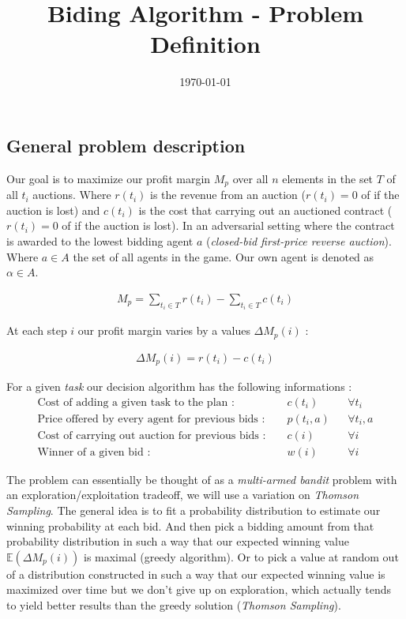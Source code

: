 \documentclass[11pt]{article}
\title{Biding Algorithm - Problem Definition}
\date{\today}
\begin{document}
\maketitle	

\subsection{General problem description}

Our goal is to maximize our profit margin $M_p$ over all $n$ elements in the set $T$ of all $t_i$ auctions. Where $r(t_i)$ is the revenue from an auction ($r(t_i)=0$ of if the auction is lost) and $c(t_i)$ is the cost that carrying out an auctioned contract ($r(t_i)=0$ of if the auction is lost). In an adversarial setting where the contract is awarded to the lowest bidding agent $a$ (\textit{closed-bid first-price reverse auction}). Where $a\in A$ the set of all agents in the game. Our own agent is denoted as $\alpha \in A$.

\begin{align}
    M_p = \sum_{t_i \in T} r(t_i) - \sum_{t_i \in T} c(t_i)
\end{align}

At each step $i$ our profit margin varies by a values $\Delta M_p(i)$ :

\begin{align}
    \Delta M_p(i) = r(t_i) - c(t_i)
\end{align}

For a given \textit{task} our decision algorithm has the following informations : 
\begin{align*}
    \text{Cost of adding a given task to the plan : } && c(t_i) && \forall t_i \\
    \text{Price offered by every agent for previous bids : } && p(t_i,a) && \forall t_i,a\\
    \text{Cost of carrying out auction for previous bids : } && c(i) && \forall i \\
    \text{Winner of a given bid : } && w(i) && \forall i
\end{align*}

The problem can essentially be thought of as a \textit{multi-armed bandit} problem with an exploration/exploitation tradeoff, we will use a variation on \textit{Thomson Sampling}. The general idea is to fit a probability distribution to estimate our winning probability at each bid. And then pick a bidding amount from that probability distribution in such a way that our expected winning value $\mathbb{E}\left(\Delta M_p(i)\right)$ is maximal (greedy algorithm). Or to pick a value at random out of a distribution constructed in such a way that our expected winning value is maximized over time but we don't give up on exploration, which actually tends to yield better results than the greedy solution (\textit{Thomson Sampling}).
\end{document}
